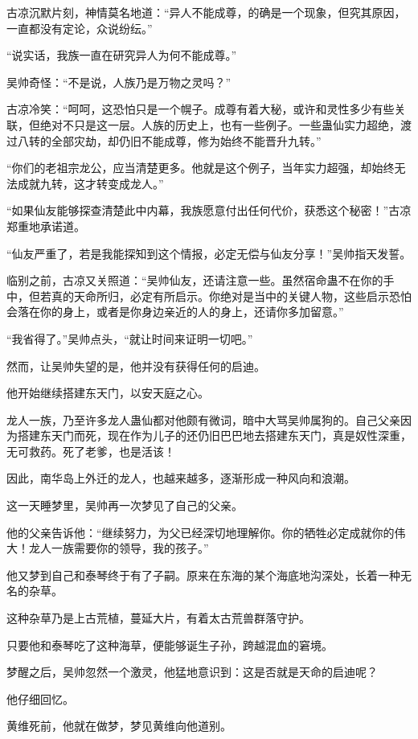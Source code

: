 \begin{this_body}
古凉沉默片刻，神情莫名地道：“异人不能成尊，的确是一个现象，但究其原因，一直都没有定论，众说纷纭。”

“说实话，我族一直在研究异人为何不能成尊。”

吴帅奇怪：“不是说，人族乃是万物之灵吗？”

古凉冷笑：“呵呵，这恐怕只是一个幌子。成尊有着大秘，或许和灵性多少有些关联，但绝对不只是这一层。人族的历史上，也有一些例子。一些蛊仙实力超绝，渡过八转的全部灾劫，却仍旧不能成尊，修为始终不能晋升九转。”

“你们的老祖宗龙公，应当清楚更多。他就是这个例子，当年实力超强，却始终无法成就九转，这才转变成龙人。”

“如果仙友能够探查清楚此中内幕，我族愿意付出任何代价，获悉这个秘密！”古凉郑重地承诺道。

“仙友严重了，若是我能探知到这个情报，必定无偿与仙友分享！”吴帅指天发誓。

临别之前，古凉又关照道：“吴帅仙友，还请注意一些。虽然宿命蛊不在你的手中，但若真的天命所归，必定有所启示。你绝对是当中的关键人物，这些启示恐怕会落在你的身上，或者是你身边亲近的人的身上，还请你多加留意。”

“我省得了。”吴帅点头，“就让时间来证明一切吧。”

然而，让吴帅失望的是，他并没有获得任何的启迪。

他开始继续搭建东天门，以安天庭之心。

龙人一族，乃至许多龙人蛊仙都对他颇有微词，暗中大骂吴帅属狗的。自己父亲因为搭建东天门而死，现在作为儿子的还仍旧巴巴地去搭建东天门，真是奴性深重，无可救药。死了老爹，也是活该！

因此，南华岛上外迁的龙人，也越来越多，逐渐形成一种风向和浪潮。

这一天睡梦里，吴帅再一次梦见了自己的父亲。

他的父亲告诉他：“继续努力，为父已经深切地理解你。你的牺牲必定成就你的伟大！龙人一族需要你的领导，我的孩子。”

他又梦到自己和泰琴终于有了子嗣。原来在东海的某个海底地沟深处，长着一种无名的杂草。

这种杂草乃是上古荒植，蔓延大片，有着太古荒兽群落守护。

只要他和泰琴吃了这种海草，便能够诞生子孙，跨越混血的窘境。

梦醒之后，吴帅忽然一个激灵，他猛地意识到：这是否就是天命的启迪呢？

他仔细回忆。

黄维死前，他就在做梦，梦见黄维向他道别。


\end{this_body}
